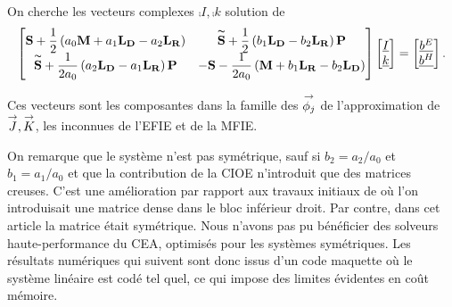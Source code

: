   \begin{prop}
    \label{prop:form_int:ci3}
    On cherche les vecteurs complexes \(\comp{I},\comp{k}\) solution de
    \begin{equation*}
      \begin{bmatrix}
        \mathbf{S} +  \dfrac{1}{2} \left(a_0 \mathbf{M} + a_1 \mathbf{L_D} - a_2 \mathbf{L_R}\right) & \mathbf{\overset{\thicksim}{S}} + \dfrac{1}{2}\left(b_1 \mathbf{L_D} - b_2 \mathbf{L_R} \right)\mathbf{P} \\
        \mathbf{\overset{\thicksim}{S}} + \dfrac{1}{2a_0}\left( a_2 \mathbf{L_D} - a_1 \mathbf{L_R} \right)\mathbf{P} & -\mathbf{S} - \dfrac{1}{2a_0}\left(\mathbf{M} + b_1 \mathbf{L_R} - b_2 \mathbf{L_D} \right)
      \end{bmatrix}
      \begin{bmatrix}
        {\underline{I}}\\
        {\underline{k}}
      \end{bmatrix}
      =
      \begin{bmatrix}
        {\underline{b^E}}\\
        {\underline{b^H}}
      \end{bmatrix}.
    \end{equation*}

    Ces vecteurs sont les composantes dans la famille des \({\overset{\rightarrow}{\phi_j}}\) de l'approximation de \({\overset{\rightarrow}{J}},{\overset{\rightarrow}{K}}\), les inconnues de l'EFIE et de la MFIE.
  \end{prop}

  On remarque que le système n'est pas symétrique, sauf si \(b_2=a_2/a_0\) et \(b_1=a_1/a_0\) et que la contribution de la CIOE n'introduit que des matrices creuses. 
  C'est une amélioration par rapport aux travaux initiaux de \cite{stupfel_implementation_2015} où l'on introduisait une matrice dense dans le bloc inférieur droit. 
  Par contre, dans cet article la matrice était symétrique. Nous n'avons pas pu bénéficier des solveurs haute-performance du CEA, optimisés pour les systèmes symétriques. 
  Les résultats numériques qui suivent sont donc issus d'un code maquette où le système linéaire est codé tel quel, ce qui impose des limites évidentes en coût mémoire. 